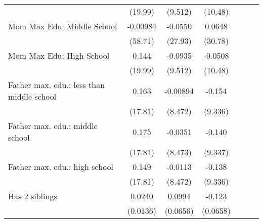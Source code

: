 {\begin{tabular}{l*{6}{c}}
                    &     (19.99)         &     (9.512)         &     (10.48)         &                     &                     &                     \\
\addlinespace
Mom Max Edu: Middle School&    -0.00984         &     -0.0550         &      0.0648         &                     &                     &                     \\
                    &     (58.71)         &     (27.93)         &     (30.78)         &                     &                     &                     \\
\addlinespace
Mom Max Edu: High School&       0.144         &     -0.0935         &     -0.0508         &                     &                     &                     \\
                    &     (19.99)         &     (9.512)         &     (10.48)         &                     &                     &                     \\
\addlinespace
Father max. edu.: less than middle school&       0.163         &    -0.00894         &      -0.154         &                     &                     &                     \\
                    &     (17.81)         &     (8.472)         &     (9.336)         &                     &                     &                     \\
\addlinespace
Father max. edu.: middle school&       0.175         &     -0.0351         &      -0.140         &                     &                     &                     \\
                    &     (17.81)         &     (8.473)         &     (9.337)         &                     &                     &                     \\
\addlinespace
Father max. edu.: high school&       0.149         &     -0.0113         &      -0.138         &                     &                     &                     \\
                    &     (17.81)         &     (8.472)         &     (9.336)         &                     &                     &                     \\
\addlinespace
Has 2 siblings      &      0.0240         &      0.0994         &      -0.123         &                     &                     &                     \\
                    &    (0.0136)         &    (0.0656)         &    (0.0658)         &                     &                     &                     \\

\end{tabular}}

